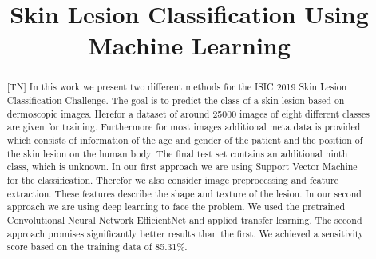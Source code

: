 \documentclass[conference]{IEEEtran}
\begin{document}
\title{Skin Lesion Classification Using Machine Learning\\}


\author{
\and
{}
\and
{}
\and
{}
}

\maketitle
\begin{abstract}[TN]
In this work we present two different methods for the ISIC 2019 Skin Lesion Classification Challenge. The goal is to predict the class of a skin lesion based on dermoscopic images. Herefor a dataset of around 25000 images of eight different classes are given for training. Furthermore for most images additional meta data is provided which consists of information of the age and gender of the patient and the position of the skin lesion on the human body. The final test set contains an additional ninth class, which is unknown.\newline
In our first approach we are using Support Vector Machine for the classification. Therefor we also consider image preprocessing and feature extraction. These features describe the shape and texture of the lesion.\newline
In our second approach we are using deep learning to face the problem. We used the pretrained Convolutional Neural Network EfficientNet and applied transfer learning.\newline
The second approach promises significantly better results than the first. We achieved a sensitivity score based on the training data of 85.31\%.
\end{abstract}





% 






\end{document}
